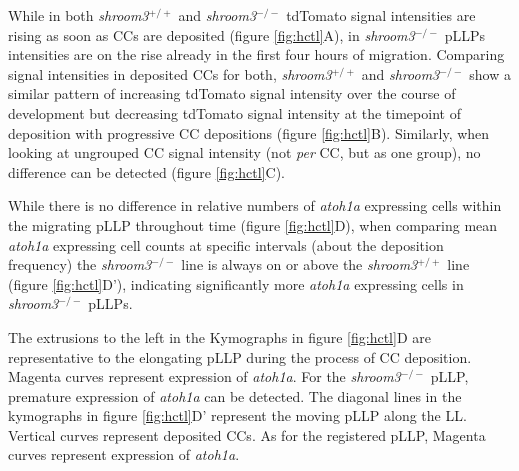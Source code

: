 \documentclass[10pt, b5paper, singlespacinge, twoside]{reedthesis} %
\theoremstyle{definition}
\theoremstyle{definition}
\theoremstyle{definition}
\theoremstyle{remark}
\begin{document}
While in both \emph{shroom3}\(^{+/+}\) and \emph{shroom3}\(^{-/-}\) tdTomato signal intensities are rising as soon as CCs are deposited (figure \ref{fig:hctl}A), in \emph{shroom3}\(^{-/-}\) pLLPs intensities are on the rise already in the first four hours of migration. Comparing signal intensities in deposited CCs for both, \emph{shroom3}\(^{+/+}\) and \emph{shroom3}\(^{-/-}\) show a similar pattern of increasing tdTomato signal intensity over the course of development but decreasing tdTomato signal intensity at the timepoint of deposition with progressive CC depositions (figure \ref{fig:hctl}B). Similarly, when looking at ungrouped CC signal intensity (not \emph{per} CC, but as one group), no difference can be detected (figure \ref{fig:hctl}C).

While there is no difference in relative numbers of \emph{atoh1a} expressing cells within the migrating pLLP throughout time (figure \ref{fig:hctl}D), when comparing mean \emph{atoh1a} expressing cell counts at specific intervals (about the deposition frequency) the \emph{shroom3}\(^{-/-}\) line is always on or above the \emph{shroom3}\(^{+/+}\) line (figure \ref{fig:hctl}D'), indicating significantly more \emph{atoh1a} expressing cells in \emph{shroom3}\(^{-/-}\) pLLPs.

The extrusions to the left in the Kymographs in figure \ref{fig:hctl}D are representative to the elongating pLLP during the process of CC deposition. Magenta curves represent expression of \emph{atoh1a}. For the \emph{shroom3}\(^{-/-}\) pLLP, premature expression of \emph{atoh1a} can be detected. The diagonal lines in the kymographs in figure \ref{fig:hctl}D' represent the moving pLLP along the LL. Vertical curves represent deposited CCs. As for the registered pLLP, Magenta curves represent expression of \emph{atoh1a}.
\end{document}
